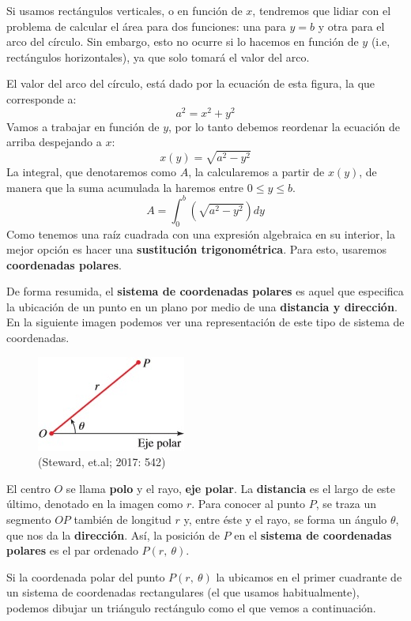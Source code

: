 \documentclass[12pt]{article}
\begin{document}
Si usamos rectángulos verticales, o en función de $x$, tendremos que lidiar con el problema de calcular el área para dos funciones: una para $y = b$ y otra para el arco del círculo. Sin embargo, esto no ocurre si lo hacemos en función de $y$ (i.e, rectángulos horizontales), ya que solo tomará el valor del arco.

El valor del arco del círculo, está dado por la ecuación de esta figura, la que corresponde a:
\[
  a^{2} = x^{2} + y^{2}
\]
Vamos a trabajar en función de $y$, por lo tanto debemos reordenar la ecuación de arriba despejando a $x$:
\[
  x(y) = \sqrt{a^{2} - y^{2}}
\]
La integral, que denotaremos como $A$, la calcularemos a partir de $x(y)$, de manera que la suma acumulada la haremos entre $0 \leq y \leq b$.
\[
  A = \int_{0}^{b} \left(\sqrt{a^{2} - y^{2}}\right) dy
\]
Como tenemos una raíz cuadrada con una expresión algebraica en su interior, la mejor opción es hacer una \textbf{sustitución trigonométrica}. Para esto, usaremos \textbf{coordenadas polares}.

De forma resumida, el \textbf{sistema de coordenadas polares} es aquel que especifica la ubicación de un punto en un plano por medio de una \textbf{distancia y dirección}. En la siguiente imagen podemos ver una representación de este tipo de sistema de coordenadas.

\begin{figure}[hbt!]
\centering
\includegraphics[scale=0.95]{img/polar-coord-1.jpg}
\caption{(Steward, et.al; 2017: 542)}
\end{figure}

El centro $O$ se llama \textbf{polo} y el rayo, \textbf{eje polar}. La \textbf{distancia} es el largo de este último, denotado en la imagen como $r$. Para conocer al punto $P$, se traza un segmento $OP$ también de longitud $r$ y, entre éste y el rayo, se forma un ángulo $\theta$, que nos da la \textbf{dirección}. Así, la posición de $P$ en el \textbf{sistema de coordenadas polares} es el par ordenado $P(r, \ \theta)$.

Si la coordenada polar del punto $P(r, \ \theta)$ la ubicamos en el primer cuadrante de un sistema de coordenadas rectangulares (el que usamos habitualmente), podemos dibujar un triángulo rectángulo como el que vemos a continuación.
\end{document}

